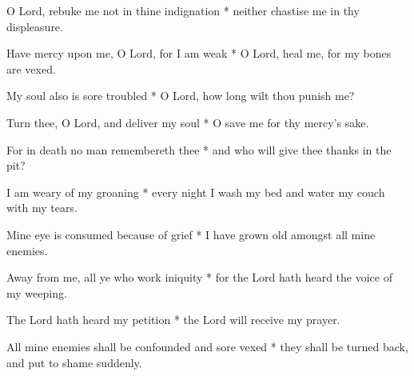 O Lord, rebuke me not in thine indignation * neither chastise me in thy displeasure.

Have mercy upon me, O Lord, for I am weak * O Lord, heal me, for my bones are vexed.

My soul also is sore troubled * O Lord, how long wilt thou punish me?

Turn thee, O Lord, and deliver my soul * O save me for thy mercy's sake.

For in death no man remembereth thee * and who will give thee thanks in the pit?

I am weary of my groaning * every night I wash my bed and water my couch with my tears.

Mine eye is consumed because of grief * I have grown old amongst all mine enemies.

Away from me, all ye who work iniquity * for the Lord hath heard the voice of my weeping.

The Lord hath heard my petition * the Lord will receive my prayer.

All mine enemies shall be confounded and sore vexed * they shall be turned back, and put to shame suddenly.